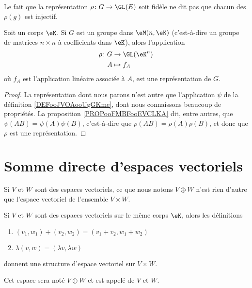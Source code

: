 Le fait que la représentation \( \rho\colon G \to \GL(E)\) soit fidèle ne dit pas que chacun des \( \rho(g)\) est injectif.

\begin{proposition}     \label{PROPooHNQOooSzeEFG}
	Soit un corps \( \eK\). Si \( G\) est un groupe dans \( \eM(n,\eK)\) (c'est-à-dire un groupe de matrices \( n\times n\) à coefficients dans \( \eK\)), alors l'application
	\begin{equation}
		\begin{aligned}
			\rho\colon G & \to \GL(\eK^n) \\
			A            & \mapsto f_A
		\end{aligned}
	\end{equation}
	où \( f_A\) est l'application linéaire associée à \( A\), est une représentation de \( G\).
\end{proposition}

\begin{proof}
	La représentation dont nous parons n'est autre que l'application \( \psi\) de la définition \ref{DEFooJVOAooUgGKme}, dont nous connaissons beaucoup de propriétés. La proposition \ref{PROPooFMBFooEVCLKA} dit, entre autres, que \( \psi(AB)=\psi(A)\psi(B)\), c'est-à-dire que \( \rho(AB)=\rho(A)\rho(B)\), et donc que \( \rho\) est une représentation.
\end{proof}


\section{Somme directe d'espaces vectoriels}

Si \( V\) et \( W\) sont des espaces vectoriels, ce que nous notons \( V\oplus W\) n'est rien d'autre que l'espace vectoriel de l'ensemble \( V\times W\).

\begin{propositionDef}                      \label{DEFooJKAWooKkkkwm}
	Si \( V\) et \( W\) sont des espaces vectoriels sur le même corps \( \eK\), alors les définitions
	\begin{enumerate}
		\item
		      \( (v_1,w_1)+(v_2,w_2)=(v_1+v_2,w_1+w_2)\)
		\item
		      \( \lambda(v,w)=(\lambda v,\lambda w)\)
	\end{enumerate}
	donnent une structure d'espace vectoriel sur \( V\times W\).

	Cet espace sera noté \( V\oplus W\) et est appelé  de \( V\) et \( W\).
\end{propositionDef}

